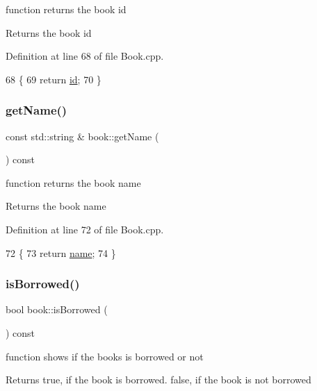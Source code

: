 function returns the book id \begin{DoxyReturn}{Returns}
the book id 
\end{DoxyReturn}


Definition at line 68 of file Book.\+cpp.


\begin{DoxyCode}
68                       \{
69     \textcolor{keywordflow}{return} \hyperlink{classbook_ad8bf54b50c72af3827823c04d724d824}{id};
70 \}
\end{DoxyCode}
\mbox{\label{classbook_ae03ca5596d9b2a5992cc9da95d04e0cb}} 
\subsubsection{\texorpdfstring{get\+Name()}{getName()}}
{\footnotesize\ttfamily const std\+::string \& book\+::get\+Name (\begin{DoxyParamCaption}{ }\end{DoxyParamCaption}) const}

function returns the book name \begin{DoxyReturn}{Returns}
the book name 
\end{DoxyReturn}


Definition at line 72 of file Book.\+cpp.


\begin{DoxyCode}
72                                      \{
73     \textcolor{keywordflow}{return} \hyperlink{classbook_a5eabc1c1c5abff26997bec3d41f90d9e}{name};
74 \}
\end{DoxyCode}
\mbox{\label{classbook_aa76dd75565c10ec36c0f4649341b4fa1}} 
\subsubsection{\texorpdfstring{is\+Borrowed()}{isBorrowed()}}
{\footnotesize\ttfamily bool book\+::is\+Borrowed (\begin{DoxyParamCaption}{ }\end{DoxyParamCaption}) const}

function shows if the books is borrowed or not \begin{DoxyReturn}{Returns}
true, if the book is borrowed. false, if the book is not borrowed 
\end{DoxyReturn}


